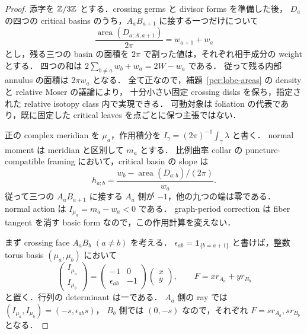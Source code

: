 \begin{proof}
添字を $\mathbb Z/3\mathbb Z$ とする．crossing germs と divisor forms を準備した後，
$D_a$ の四つの critical basins のうち，$A_aB_{a+1}$ に接する一つだけについて
\begin{equation}\label{quad:basin-areas}
 \frac{\operatorname{area}(D_{a;A,a+1})}{2\pi}=w_{a+1}+w_a
\end{equation}
とし，残る三つの basin の面積を $2\pi$ で割った値は，それぞれ相手成分の weight とする．
四つの和は $2\sum_{b\ne a}w_b+w_a=2W-w_a$ である．
従って残る内部 annulus の面積は $2\pi w_a$ となる．
全て正なので，補題~\ref{per:lobe-areas} の density と relative Moser の議論により，
十分小さい固定 crossing disks を保ち，指定された relative isotopy class 内で実現できる．
可動対象は foliation の代表であり，既に固定した critical leaves を点ごとに保つ主張ではない．

正の complex meridian を $\mu_a$，作用積分を
$I_\gamma=(2\pi)^{-1}\int_\gamma\lambda$ と書く．
normal moment は meridian と区別して $m_a$ とする．
比例曲率 collar の puncture-compatible framing において，critical basin の slope は
\begin{equation}\label{quad:critical-slope}
 h_{a;b}=\frac{w_b-\operatorname{area}(D_{a;b})/(2\pi)}{w_a}.
\end{equation}
従って三つの $A_aB_{a+1}$ に接する $A_a$ 側が $-1$，他の九つの端は零である．
normal action は $I_{\mu_a}=m_a-w_a<0$ である．
graph-period correction は fiber tangent を消す basic form なので，この作用計算を変えない．

まず crossing face $A_aB_b$ $(a\ne b)$ を考える．
$\epsilon_{ab}=\mathbf1_{\{b=a+1\}}$ と書けば，整数 torus basis $(\mu_a,\mu_b)$ において
\begin{equation}\label{quad:crossing-map}
 \begin{pmatrix}I_{\mu_a}\\I_{\mu_b}\end{pmatrix}
 =\begin{pmatrix}-1&0\\\epsilon_{ab}&-1\end{pmatrix}
   \begin{pmatrix}x\\y\end{pmatrix},
 \qquad F=xr_{A_a}+yr_{B_b}
\end{equation}
と置く．行列の determinant は一である．
$A_a$ 側の ray では $(I_{\mu_a},I_{\mu_b})=(-s,\epsilon_{ab}s)$，
$B_b$ 側では $(0,-s)$ なので，それぞれ $F=sr_{A_a},sr_{B_b}$ となる．


\end{proof}
